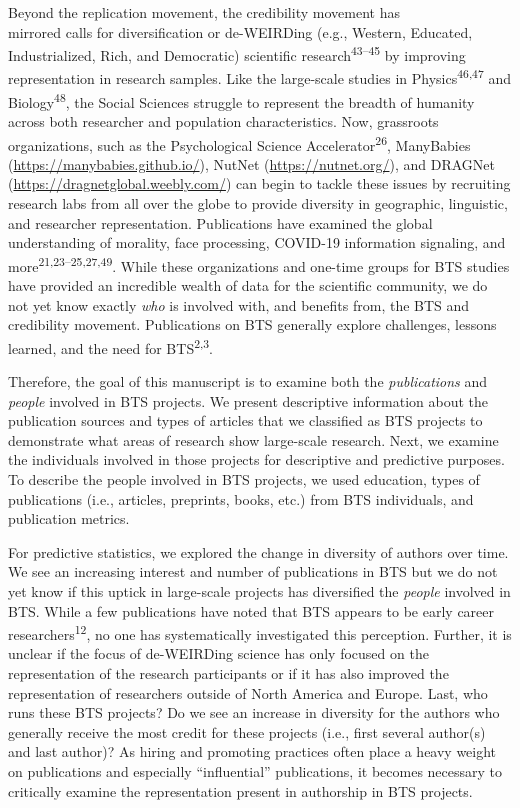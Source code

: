\documentclass[
  man,floatsintext]{apa6}
\begin{document}
Beyond the replication movement, the credibility movement has\\
mirrored calls for
diversification or de-WEIRDing (e.g., Western, Educated, Industrialized,
Rich, and Democratic) scientific research\textsuperscript{43--45} by improving representation in research samples. Like the
large-scale studies in Physics\textsuperscript{46,47} and
Biology\textsuperscript{48}, the Social Sciences struggle to represent the
breadth of humanity across both researcher and population
characteristics. Now, grassroots organizations, such as the
Psychological Science Accelerator\textsuperscript{26}, ManyBabies
(\url{https://manybabies.github.io/}), NutNet (\url{https://nutnet.org/}), and
DRAGNet (\url{https://dragnetglobal.weebly.com/}) can begin to tackle these
issues by recruiting research labs from all over the globe to provide
diversity in geographic, linguistic, and researcher representation.
Publications have examined the global understanding of morality, face
processing, COVID-19 information signaling, and more\textsuperscript{21,23--25,27,49}. While these organizations and one-time groups
for BTS studies have provided an incredible wealth of data for the
scientific community, we do not yet know exactly \emph{who} is involved with,
and benefits from, the BTS and credibility movement. Publications on BTS
generally explore challenges, lessons learned, and the need for BTS\textsuperscript{2,3}.

Therefore, the goal of this manuscript is to examine both the \emph{publications} and \emph{people} involved in BTS projects. We present descriptive information about the publication sources and types of articles that we classified as BTS projects to demonstrate what areas of research show large-scale research. Next, we examine the individuals involved in those projects for descriptive and predictive purposes. To describe the people involved in BTS projects, we used education, types of publications (i.e., articles, preprints, books, etc.) from BTS individuals, and publication metrics.

For predictive statistics, we explored the change in diversity of authors over time. We see an increasing interest and number of publications in BTS but we do not yet
know if this uptick in large-scale projects has diversified the \emph{people}
involved in BTS. While a few publications have noted that BTS appears to
be early career researchers\textsuperscript{12}, no one has systematically
investigated this perception. Further, it is unclear if the focus of
de-WEIRDing science has only focused on the representation of the
research participants or if it has also improved the representation of
researchers outside of North America and Europe. Last, who runs these
BTS projects? Do we see an increase in diversity for the authors who
generally receive the most credit for these projects (i.e., first
several author(s) and last author)? As hiring and promoting practices
often place a heavy weight on publications and especially ``influential''
publications, it becomes necessary to critically examine the
representation present in authorship in BTS projects.
\end{document}
